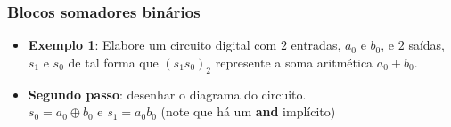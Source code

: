 \documentclass{beamer}
\begin{document}

\begin{frame}
\frametitle{Blocos somadores binários}

\begin{itemize}
\item \textbf{Exemplo 1}: Elabore um circuito digital com $2$ entradas, $a_0$ e $b_0$, e $2$ saídas, $s_1$ e $s_0$ de tal forma que $(s_1 s_0)_2$ represente a soma aritmética $a_0 + b_0$.

\item \textbf{Segundo passo}: desenhar o diagrama do circuito.\\
$s_0 = a_0 \oplus b_0$ \; e \; $s_1 = a_0 b_0$ (note que há um \textbf{and} implícito)\\[6pt]


\end{itemize}
\end{frame}
\end{document}
